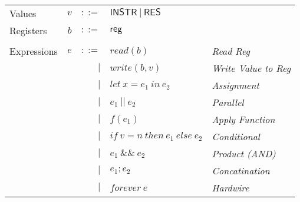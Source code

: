 \documentclass[12pt, letterpaper]{article}
\begin{document}
  \begin{tabular}{l r r l l}
    Values        & $v$     & $::=$     & $\mathsf{INSTR\ |\ RES}$ &\\
    Registers     & $b$     & $::=$     & $\mathsf{reg}$           &\\
    \\
    Expressions & $e$ & $::=$  & $read(b)$       
                      & \textit{Read Reg}\\
                &     & $\mid$ & $write(b,v)$    
                      & \textit{Write Value to Reg}\\
                &     & $\mid$ & $let\ x = e_1\ in\ e_2$ 
                      & \textit{Assignment}\\  
                &     & $\mid$ & $e_1\ ||\ e_2$ 
                      & \textit{Parallel}\\
                &     & $\mid$ & $f(e_1)$        
                      & \textit{Apply Function} \\  
                &     & $\mid$ & $if\ v = n\ then\ e_1\ else\ e_2$
                      & \textit{Conditional} \\
                &     & $\mid$ & $e_1\ \&\&\ e_2$ 
                      & \textit{Product (AND)}\\
                &     & $\mid$ & $e_1 ; e_2$
                      & \textit{Concatination}\\
                &     & $\mid$ & $forever\ e$ 
                      & \textit{Hardwire}
  \end{tabular}
\end{document}
